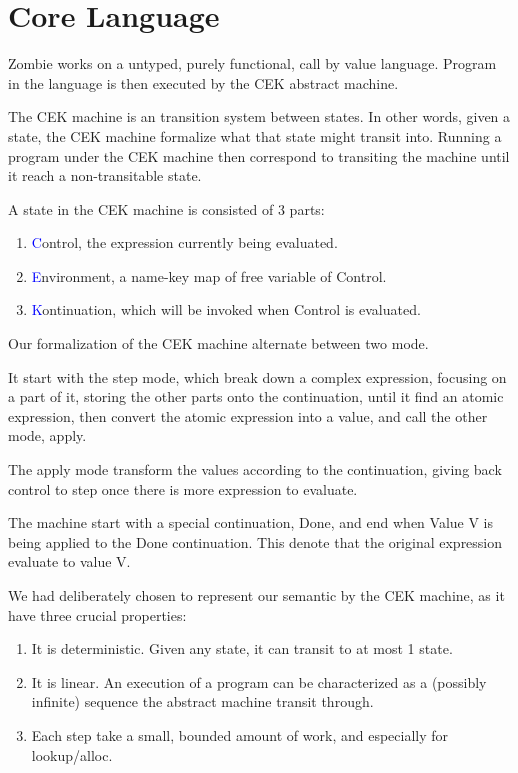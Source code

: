 \section{Core Language}	
Zombie works on a untyped, purely functional, call by value language. Program in the language is then executed by the CEK abstract machine.

The CEK machine is an transition system between states. In other words, given a state, the CEK machine formalize what that state might transit into. Running a program under the CEK machine then correspond to transiting the machine until it reach a non-transitable state.

A state in the CEK machine is consisted of 3 parts:

\begin{enumerate}
	\item \textcolor{blue}{C}ontrol, the expression currently being evaluated.
	\item \textcolor{blue}{E}nvironment, a name-key map of free variable of Control.
	\item \textcolor{blue}{K}ontinuation, which will be invoked when Control is evaluated.
\end{enumerate}

Our formalization of the CEK machine alternate between two mode.

It start with the step mode, which break down a complex expression, focusing on a part of it, storing the other parts onto the continuation, until it find an atomic expression, then convert the atomic expression into a value, and call the other mode, apply.

The apply mode transform the values according to the continuation, giving back control to step once there is more expression to evaluate.

The machine start with a special continuation, Done, and end when Value V is being applied to the Done continuation. This denote that the original expression evaluate to value V.

We had deliberately chosen to represent our semantic by the CEK machine, as it have three crucial properties:

\begin{enumerate}
	\item It is deterministic. Given any state, it can transit to at most 1 state.
	
	\item It is linear. An execution of a program can be characterized as a (possibly infinite) sequence the abstract machine transit through.
	
	\item Each step take a small, bounded amount of work, and especially for lookup/alloc.
\end{enumerate}

